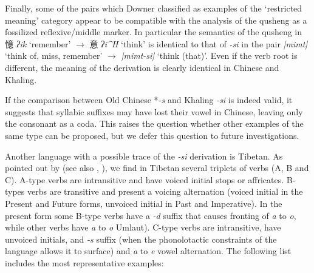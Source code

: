 \documentclass[oneside,a4paper,11pt]{article}
\newcommand{\ipa}[1]{{\phon\textit{\mbox{#1}}}}
\newcommand{\zh}[1]{{\cn#1}}
\newcommand{\ch}[3]{\zh{#1} \ipa{#2} `#3'}
\begin{document}
Finally, some of the pairs which Downer classified as examples of the `restricted meaning' category appear to be compatible with the analysis of the qusheng as a fossilized reflexive/middle marker. In particular the semantics of the qusheng in \ch{憶}{ʔik}{remember} $\rightarrow$ \ch{意}{ʔi^H}{think} is identical to that of \ipa{-si} in the pair \ipa{|mimt|} `think of, miss, remember' $\rightarrow$ \ipa{|mimt-si|} `think (that)'. Even if the verb root is different, the meaning of the derivation is clearly identical in Chinese and Khaling.

If the comparison between Old Chinese *\ipa{-s} and Khaling \ipa{-si} is indeed valid, it suggests that syllabic suffixes may have lost their vowel in Chinese, leaving only the consonant as a coda. This raises the question whether other examples of the same type can be proposed, but we defer this question to future investigations.

Another language with a possible trace of the \ipa{-si} derivation is Tibetan. As pointed out by \citet{hill14voicing} (see also \citealt{uray53morphology}, \citealt[864]{zeisler04}), we find in Tibetan several triplets of verbs (A, B and C). A-type verbs are intransitive and have voiced initial stops or affricates. B-types verbs are transitive and present a voicing alternation (voiced initial in the Present and Future forms, unvoiced initial in Past and Imperative). In the present form some B-type verbs have a \ipa{-d} suffix that causes fronting of \ipa{a} to \ipa{o}, while other verbs have \ipa{a} to \ipa{o} Umlaut). C-type verbs are intransitive, have unvoiced initials, and \ipa{-s} suffix (when the phonolotactic constraints of the language allows it to surface) and \ipa{a} to \ipa{e} vowel alternation. The following list includes the most representative examples:
\end{document}
